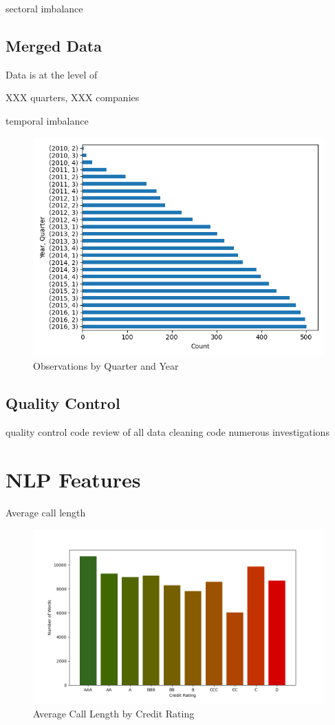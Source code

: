 \documentclass{article}
\begin{document}
    sectoral imbalance

    \subsection*{Merged Data}

    Data is at the level of

    XXX quarters, XXX companies

    temporal imbalance

    \begin{figure}[h!]
		\centering
        \caption{Observations by Quarter and Year}
        \includegraphics[width=0.5\linewidth,keepaspectratio=true]{../Output/All Data EDA/Tabular EDA/all_data_fixed_quarter_dates_obs_by_year_quarter_no_title.png}
	\end{figure}

    \subsection*{Quality Control}

    quality control
    code review of all data cleaning code
    numerous investigations

    \section*{NLP Features}

    Average call length

    \begin{figure}[h!]
		\centering
        \caption{Average Call Length by Credit Rating}
        \includegraphics[width=0.5\linewidth,keepaspectratio=true]{../Output/All Data EDA/NLP EDA/all_data_call_length_by_credit_rating_no_title.png}
	\end{figure}
\end{document}
